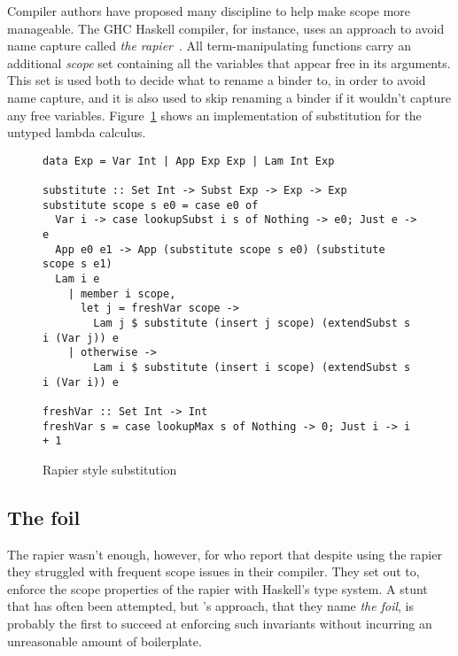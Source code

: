 \documentclass[sigconf, anonymous, review]{acmart}
\begin{document}
Compiler authors have proposed many discipline to help make scope more
manageable.
The GHC Haskell compiler, for instance, uses an approach to avoid name capture called
\textit{the rapier}~\cite{peytonjones02secrets}. All term-manipulating functions
carry an additional \textit{scope} set containing all the
variables that appear free in its arguments. This set is
used both to decide what to rename a binder to, in order to avoid name capture,
and it is also used to skip renaming a binder if it wouldn't capture any free
variables. Figure~\ref{rapier-style-substitution} shows an implementation of
substitution
for the untyped lambda calculus.

\begin{figure}
\begin{verbatim}
data Exp = Var Int | App Exp Exp | Lam Int Exp

substitute :: Set Int -> Subst Exp -> Exp -> Exp
substitute scope s e0 = case e0 of
  Var i -> case lookupSubst i s of Nothing -> e0; Just e -> e
  App e0 e1 -> App (substitute scope s e0) (substitute scope s e1)
  Lam i e
    | member i scope,
      let j = freshVar scope ->
        Lam j $ substitute (insert j scope) (extendSubst s i (Var j)) e
    | otherwise ->
        Lam i $ substitute (insert i scope) (extendSubst s i (Var i)) e

freshVar :: Set Int -> Int
freshVar s = case lookupMax s of Nothing -> 0; Just i -> i + 1
\end{verbatim}
\caption{Rapier style substitution}
\label{rapier-style-substitution}
\end{figure}

\subsection{The foil}
\label{the-rapier-with-stronger-types}

The rapier wasn't enough, however, for \citet{maclaurin23} who report that
despite using the rapier they struggled with frequent scope issues in their
compiler. They set out to, enforce the scope properties of the rapier with
Haskell's type system. A stunt that has often been attempted, but
\cite{maclaurin23}'s approach, that they name \emph{the foil}, is probably the
first to succeed at enforcing such invariants without incurring an unreasonable
amount of boilerplate.
\end{document}

